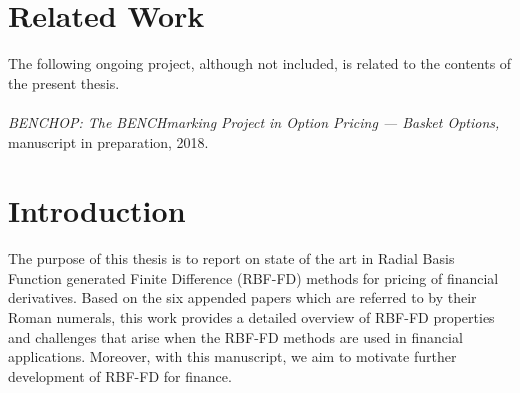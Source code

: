 \documentclass{UUThesisTemplate}
\begin{document}
    




%
\chapter*{Related Work}
    \noindent The following ongoing project, although not included, is related to the contents of the present thesis.\\\\
    \emph{BENCHOP: The BENCHmarking Project in Option Pricing --- Basket Options,}  	  
    manuscript in preparation, 2018. \label{paper7}	

    \begingroup
        \tableofcontents
    \endgroup

\mainmatter
%    
%    
%    

%    
%
%





%
\chapter{Introduction}
\label{ch:introduction}

\par
The purpose of this thesis is to report on state of the art in Radial Basis Function generated Finite Difference (RBF-FD) methods for pricing of financial derivatives. Based on the six appended papers which are referred to by their Roman numerals, this work provides a detailed overview of RBF-FD properties and challenges that arise when the RBF-FD methods are used in financial applications. Moreover, with this manuscript, we aim to motivate further development of RBF-FD for finance.
\end{document}
